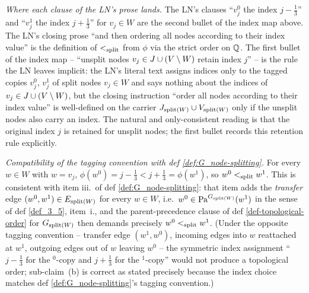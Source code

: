\documentclass[main]{subfiles}
\begin{document}
\begin{Rem}[SplitTopologicalOrder]
    \emph{Where each clause of the LN's prose lands.}
    The LN's clauses ``$v_j^0$ the index $j - \tfrac{1}{3}$'' and ``$v_j^1$ the index $j + \tfrac{1}{3}$'' for $v_j \in W$ are the second bullet of the index map above. The LN's closing prose ``and then ordering all nodes according to their index value'' is the definition of $<_{\mathrm{split}}$ from $\phi$ via the strict order on $\mathbb{Q}$. The first bullet of the index map -- ``unsplit nodes $v_j \in J \cup (V \setminus W)$ retain index $j$'' -- is the rule the LN leaves implicit: the LN's literal text assigns indices only to the tagged copies $v_j^0$, $v_j^1$ of split nodes $v_j \in W$ and says nothing about the indices of $v_j \in J \cup (V \setminus W)$, but the closing instruction ``order all nodes according to their index value'' is well-defined on the carrier $J_{\mathrm{split}(W)} \cup V_{\mathrm{split}(W)}$ only if the unsplit nodes also carry an index. The natural and only-consistent reading is that the original index $j$ is retained for unsplit nodes; the first bullet records this retention rule explicitly.

    \emph{Compatibility of the tagging convention with def \ref{def:G_node-splitting}.}
    For every $w \in W$ with $w = v_j$, $\phi(w^0) = j - \tfrac{1}{3} < j + \tfrac{1}{3} = \phi(w^1)$, so $w^0 <_{\mathrm{split}} w^1$. This is consistent with item iii.\ of def \ref{def:G_node-splitting}: that item adds the \emph{transfer} edge $(w^0, w^1) \in E_{\mathrm{split}(W)}$ for every $w \in W$, i.e.\ $w^0 \in \mathrm{Pa}^{G_{\mathrm{split}(W)}}(w^1)$ in the sense of def \ref{def_3_5}, item~i., and the parent-precedence clause of def \ref{def-topological-order} for $G_{\mathrm{split}(W)}$ then demands precisely $w^0 <_{\mathrm{split}} w^1$. (Under the opposite tagging convention -- transfer edge $(w^1, w^0)$, incoming edges into $w$ reattached at $w^1$, outgoing edges out of $w$ leaving $w^0$ -- the symmetric index assignment ``$j - \tfrac{1}{3}$ for the $^0$-copy and $j + \tfrac{1}{3}$ for the $^1$-copy'' would not produce a topological order; sub-claim~(b) is correct as stated precisely because the index choice matches def \ref{def:G_node-splitting}'s tagging convention.)


\end{Rem}
\end{document}
